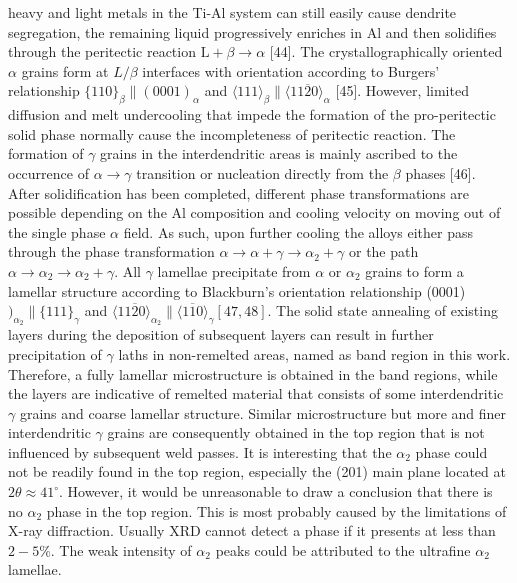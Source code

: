\documentclass[10pt]{article}
\begin{document}
heavy and light metals in the Ti-Al system can still easily cause dendrite segregation, the remaining liquid progressively enriches in $\mathrm{Al}$ and then solidifies through the peritectic reaction $\mathrm{L}+\beta \rightarrow \alpha$ [44]. The crystallographically oriented $\alpha$ grains form at $L / \beta$ interfaces with orientation according to Burgers' relationship $\{110\}_{\beta} \|(0001)_{\alpha}$ and $\langle 111\rangle_{\beta} \|\langle 11 \overline{2} 0\rangle_{\alpha}$ [45]. However, limited diffusion and melt undercooling that impede the formation of the pro-peritectic solid phase normally cause the incompleteness of peritectic reaction. The formation of $\gamma$ grains in the interdendritic areas is mainly ascribed to the occurrence of $\alpha \rightarrow \gamma$ transition or nucleation directly from the $\beta$ phases [46]. After solidification has been completed, different phase transformations are possible depending on the $\mathrm{Al}$ composition and cooling velocity on moving out of the single phase $\alpha$ field. As such, upon further cooling the alloys either pass through the phase transformation $\alpha \rightarrow \alpha+\gamma \rightarrow \alpha_{2}+\gamma$ or the path $\alpha \rightarrow \alpha_{2} \rightarrow \alpha_{2}+\gamma$. All $\gamma$ lamellae precipitate from $\alpha$ or $\alpha_{2}$ grains to form a lamellar structure according to Blackburn's orientation relationship (0001) $)_{\alpha_{2}} \|\{111\}_{\gamma}$ and $\langle 11 \overline{2} 0\rangle_{\alpha_{2}} \|\langle 1 \overline{1} 0\rangle_{\gamma}[47,48]$. The solid state annealing of existing layers during the deposition of subsequent layers can result in further precipitation of $\gamma$ laths in non-remelted areas, named as band region in this work. Therefore, a fully lamellar microstructure is obtained in the band regions, while the layers are indicative of remelted material that consists of some interdendritic $\gamma$ grains and coarse lamellar structure. Similar microstructure but more and finer interdendritic $\gamma$ grains are consequently obtained in the top region that is not influenced by subsequent weld passes. It is interesting that the $\alpha_{2}$ phase could not be readily found in the top region, especially the (201) main plane located at $2 \theta \approx 41^{\circ}$. However, it would be unreasonable to draw a conclusion that there is no $\alpha_{2}$ phase in the top region. This is most probably caused by the limitations of X-ray diffraction. Usually XRD cannot detect a phase if it presents at less than $2-5 \%$. The weak intensity of $\alpha_{2}$ peaks could be attributed to the ultrafine $\alpha_{2}$ lamellae.
\end{document}
